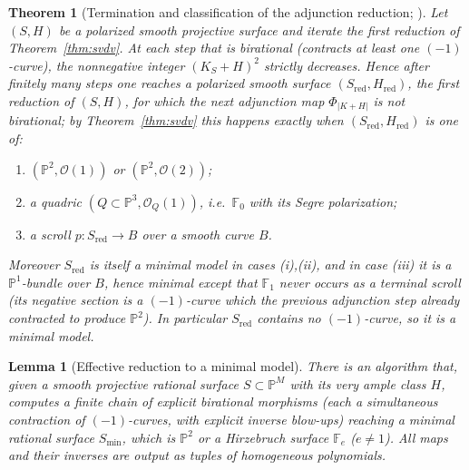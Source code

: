 \documentclass{amsart}
\theoremstyle{plain}
\newtheorem{theorem}{Theorem}
\newtheorem{lemma}{Lemma}
\theoremstyle{definition}
\newcommand{\PP}{\mathbb{P}}
\newcommand{\cO}{\mathcal{O}}
\begin{document}
\begin{theorem}[Termination and classification of the adjunction reduction;
{\cite[Ch.~1, esp.\ Thm.~1.4.2 and Prop.~1.4.3]{BS}}]\label{thm:adjterm}
Let $(S,H)$ be a polarized smooth projective surface and iterate the first
reduction of Theorem~\ref{thm:svdv}.  At each step that is birational (contracts
at least one $(-1)$-curve), the nonnegative integer $(K_S+H)^2$ strictly
decreases.  Hence after finitely many steps one reaches a polarized smooth
surface $(S_{\mathrm{red}},H_{\mathrm{red}})$, the \emph{first reduction} of
$(S,H)$, for which the next adjunction map $\Phi_{|K+H|}$ is \emph{not}
birational; by Theorem~\ref{thm:svdv} this happens exactly when
$(S_{\mathrm{red}},H_{\mathrm{red}})$ is one of:
\begin{enumerate}
\item[(i)] $(\PP^2,\cO(1))$ or $(\PP^2,\cO(2))$;
\item[(ii)] a quadric $(Q\subset\PP^3,\cO_Q(1))$, i.e.\ $\mathbb F_0$ with its
Segre polarization;
\item[(iii)] a scroll $p\colon S_{\mathrm{red}}\to B$ over a smooth curve $B$.
\end{enumerate}
Moreover $S_{\mathrm{red}}$ is itself a minimal model in cases \textup{(i),(ii)},
and in case \textup{(iii)} it is a $\PP^1$-bundle over $B$, hence minimal except
that $\mathbb F_1$ never occurs as a terminal scroll (its negative section is a
$(-1)$-curve which the previous adjunction step already contracted to produce
$\PP^2$).  In particular $S_{\mathrm{red}}$ contains no $(-1)$-curve, so it is a
minimal model.
\end{theorem}

\begin{lemma}[Effective reduction to a minimal model]\label{lem:mmp}
There is an algorithm that, given a smooth projective rational surface
$S\subset\PP^M$ with its very ample class $H$, computes a finite chain of explicit
birational morphisms (each a simultaneous contraction of $(-1)$-curves, with
explicit inverse blow-ups) reaching a minimal rational surface $S_{\min}$, which
is $\PP^2$ or a Hirzebruch surface $\mathbb F_e$ ($e\ne1$).  All maps and their
inverses are output as tuples of homogeneous polynomials.
\end{lemma}
\end{document}
